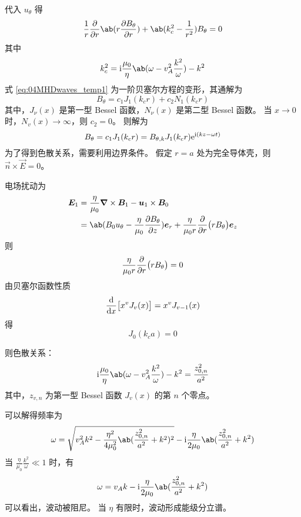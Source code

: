 代入 $u_\theta$ 得
\begin{equation} \label{eq:04MHDwaves_temp1}
\frac{1}{r} \pdv{}{r} \ab( r \pdv{B_\theta}{r} )
+ \ab( k_c^2 - \frac{1}{r^2} ) B_\theta = 0
\end{equation}
其中
\begin{equation}
k_c^2 = \im \frac{\mu_0}{\eta} \ab( \omega - v_A^2 \frac{k^2}{\omega} ) - k^2
\end{equation}
式 \ref{eq:04MHDwaves_temp1} 为一阶贝塞尔方程的变形，其通解为
\begin{equation}
B_\theta = c_1 J_1(k_c r) + c_2 N_1(k_c r)
\end{equation}
其中，$J_\nu(x)$ 是第一型 Bessel 函数，$N_\nu(x)$ 是第二型 Bessel 函数。
当 $x \to 0$ 时，$N_v(x) \to \infty$，则 $c_2 = 0$。
则解为
\begin{equation}
B_\theta = c_1 J_1(k_c r)
= B_{\theta,k} J_1(k_c r)
\mathrm{e}^{\mathrm{i}(k z - \omega t)}
\end{equation}
为了得到色散关系，需要利用边界条件。
假定 $r = a$ 处为完全导体壳，则 $\vec{n} \times \vec{E} = 0$。

电场扰动为
\begin{equation}\begin{aligned}
\vec{E}_1 &= \frac{\eta}{\mu_0} \curl{\vec{B}_1}
- \vec{u}_1 \times \vec{B}_0 \\
&= \ab( B_0 u_\theta - \frac{\eta}{\mu_0} \pdv{B_\theta}{z} ) \vec{e}_r
+ \frac{\eta}{\mu_0 r} \pdv{}{r} \big( r B_\theta \big) \vec{e}_z
\end{aligned}\end{equation}
则
\begin{equation}
\frac{\eta}{\mu_0 r} \pdv{}{r} \big( r B_\theta \big) = 0
\end{equation}
由贝塞尔函数性质
\begin{equation}
\odv{}{x} \big[ x^v J_v(x) \big] = x^v J_{v-1}(x)
\end{equation}
得
\begin{equation}
J_0(k_c a) = 0
\end{equation}

则色散关系：
\begin{equation}
\im \frac{\mu_0}{\eta} \ab( \omega - v_A^2 \frac{k^2}{\omega} ) - k^2 = \frac{z_{0,n}^2}{a^2}
\end{equation}
其中，$z_{v,n}$ 为第一型 Bessel 函数 $J_v(x)$ 的第 $n$ 个零点。

可以解得频率为
\begin{equation}
\omega = \sqrt{
    v_A^2 k^2
    - \frac{\eta^2}{4 \mu_0^2} \ab( \frac{z_{0,n}^2}{a^2} + k^2 )^2
} - \im \frac{\eta}{2 \mu_0} \ab( \frac{z_{0,n}^2}{a^2} + k^2 )
\end{equation}
当 $\frac{\eta}{\mu_0} \frac{k^2}{\omega} \ll 1$ 时，有
\begin{equation}
\omega = v_A k - \im \frac{\eta}{2 \mu_0} \ab( \frac{z_{0,n}^2}{a^2} + k^2 )
\end{equation}
可以看出，波动被阻尼。
当 $\eta$ 有限时，波动形成能级分立谱。

